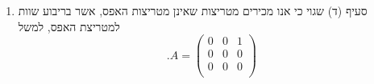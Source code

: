 \documentclass[12pt, a4paper]{article}
\begin{document}
\begin{enumerate}
עבור פש״א שהוא החלפת שורה
\begin{align*}
,E=\begin{pmatrix}
1&0&0\\
0&0&1\\
0&1&0\\
\end{pmatrix},
\begin{pmatrix}
0&1&0\\
1&0&0\\
0&0&1\\
\end{pmatrix},
\begin{pmatrix}
0&0&1\\
0&1&0\\
1&0&0\\
\end{pmatrix}
\Longrightarrow
E^t=E
\end{align*}
עבור פש״א שהוא הכפלת שורה בסקלר
\begin{align*}
,E=\begin{pmatrix}
\alpha&0&0\\
0&1&0\\
0&0&1\\
\end{pmatrix},
\begin{pmatrix}
1&0&0\\
0&\alpha&0\\
0&0&1\\
\end{pmatrix},
\begin{pmatrix}
1&0&0\\
0&1&0\\
0&0&\alpha\\
\end{pmatrix}
\Longrightarrow
E^t=E
\end{align*}
עבור פש״א מסוג
$R_i+\alpha R_j\rightarrow R_i$,
נקבל כי
$E^t$
היא  אלמנטרית המתאימה לפש״א
$R_j+\alpha R_i\rightarrow R_j$.
למשל,
\begin{align*}
.E=\begin{pmatrix}
1&\alpha&0\\
0&1&0\\
0&0&1\\
\end{pmatrix}
\Longrightarrow
E^t=\begin{pmatrix}
1&0&0\\
\alpha&1&0\\
0&0&1\\
\end{pmatrix}
\end{align*}
\item[$\bullet$]
סעיף (ד) שגוי כי אנו מכירים מטריצות שאינן מטריצות האפס, אשר בריבוע שוות למטריצת האפס, למשל
$$.A=\begin{pmatrix}
0&0&1\\0&0&0\\0&0&0\\
\end{pmatrix}$$
\newpage


\end{enumerate}
\end{document}
